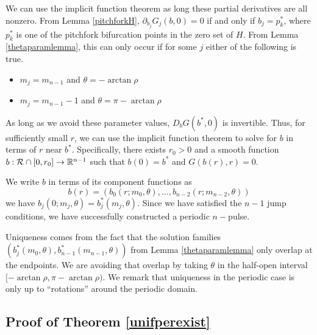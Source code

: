 \documentclass[thesis.tex]{subfiles}
\begin{document}
We can use the implicit function theorem as long these partial derivatives are all nonzero. From Lemma \ref{pitchforkH}, $\partial_{b_j} G_j(b, 0) = 0$ if and only if $b_j = p_k^*$, where $p_k^*$ is one of the pitchfork bifurcation points in the zero set of $H$. From Lemma \ref{thetaparamlemma}, this can only occur if for some $j$ either of the following is true.
\begin{itemize}
\item $m_j = m_{n-1}$ and $\theta = -\arctan \rho$
\item $m_j = m_{n-1} - 1$ and $\theta = \pi-\arctan \rho$
\end{itemize}
As long as we avoid these parameter values, $D_b G(b^*, 0)$ is invertible. Thus, for sufficiently small $r$, we can use the implicit function theorem to solve for $b$ in terms of $r$ near $b^*$. Specifically, there exists $r_0 > 0$ and a smooth function $b: \mathcal{R} \cap [0, r_0] \rightarrow \mathbb{R}^{n-1}$ such that $b(0) = b^*$ and $G(b(r),r) = 0$. 

We write $b$ in terms of its component functions as
\[
b(r) = \left( b_0(r; m_0, \theta), \dots, b_{n-2}(r; m_{n-2}, \theta) \right)
\]
we have $b_j(0; m_j, \theta) = b_j^*(m_j, \theta)$. Since we have satisfied the $n-1$ jump conditions, we have successfully constructed a periodic $n-$pulse.

Uniqueness comes from the fact that the solution families $(b_j^*(m_0, \theta), b_{n-1}^*(m_{n-1}, \theta))$ from Lemma \eqref{thetaparamlemma} only overlap at the endpoints. We are avoiding that overlap by taking $\theta$ in the half-open interval $[-\arctan \rho, \pi - \arctan \rho)$. We remark that uniqueness in the periodic case is only up to ``rotations'' around the periodic domain.

\subsection{Proof of Theorem \ref{unifperexist}}
\end{document}

